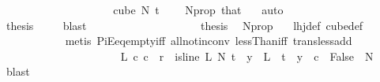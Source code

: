 \begin{isabellebody}
\ \ \ \ \ \ \ \ \isamarkupfalse%
{\isacharminus}{\kern0pt}\isanewline
\ \ \ \ \ \ \ \ \ \ \isamarkupfalse%
\ {\isachardoublequoteopen}cube\ N{\isacharprime}{\kern0pt}\ t\ {\isasymnoteq}\ {\isacharbraceleft}{\kern0pt}{\isacharbraceright}{\kern0pt}{\isachardoublequoteclose}\ \isamarkupfalse%
\ N{\isacharunderscore}{\kern0pt}prop{\isacharparenleft}{\kern0pt}{}{\isacharparenright}{\kern0pt}\ that\ {}\ \isamarkupfalse%
\ auto\ \ \ \isanewline
\ \ \ \ \ \ \ \ \ \ \isamarkupfalse%
\ \isamarkupfalse%
\ {\isacharquery}{\kern0pt}thesis\ \isamarkupfalse%
\ {}\ \isamarkupfalse%
\ blast\isanewline
\ \ \ \ \ \ \ \ \isamarkupfalse%
\isanewline
\ \ \ \ \ \ \ \ \isamarkupfalse%
\ \isamarkupfalse%
\ {\isacharquery}{\kern0pt}thesis\ \isamarkupfalse%
\ N{\isacharunderscore}{\kern0pt}prop\ \ \isamarkupfalse%
\ lhj{\isacharunderscore}{\kern0pt}def\ cube{\isacharunderscore}{\kern0pt}def\ \isanewline
\ \ \ \ \ \ \ \ \ \ \isamarkupfalse%
\ {\isacharparenleft}{\kern0pt}metis\ PiE{\isacharunderscore}{\kern0pt}eq{\isacharunderscore}{\kern0pt}empty{\isacharunderscore}{\kern0pt}iff\ all{\isacharunderscore}{\kern0pt}not{\isacharunderscore}{\kern0pt}in{\isacharunderscore}{\kern0pt}conv\ lessThan{\isacharunderscore}{\kern0pt}iff\ trans{\isacharunderscore}{\kern0pt}less{\isacharunderscore}{\kern0pt}add{}{\isacharparenright}{\kern0pt}\ \isanewline
\ \ \ \ \ \ \isamarkupfalse%
\isanewline
\ \ \ \ \ \ \ \ \isamarkupfalse%
\ {}\isanewline
\ \ \ \ \ \ \ \ \isamarkupfalse%
\ \isamarkupfalse%
\ {\isachardoublequoteopen}{\isacharparenleft}{\kern0pt}{\isasymexists}L\ c{\isachardot}{\kern0pt}\ c\ {\isacharless}{\kern0pt}\ r\ {\isasymand}\ is{\isacharunderscore}{\kern0pt}line\ L\ N{\isacharprime}{\kern0pt}\ t\ {\isasymand}\ {\isacharparenleft}{\kern0pt}{\isasymforall}y\ {\isasymin}\ L\ {\isacharbackquote}{\kern0pt}\ {\isacharbraceleft}{\kern0pt}{\isachardot}{\kern0pt}{\isachardot}{\kern0pt}{\isacharless}{\kern0pt}t{\isacharbraceright}{\kern0pt}{\isachardot}{\kern0pt}\ {\isasymchi}\ y\ {\isacharequal}{\kern0pt}\ c{\isacharparenright}{\kern0pt}{\isacharparenright}{\kern0pt}\ {\isasymLongrightarrow}\ False{\isachardoublequoteclose}\ \ N{\isacharprime}{\kern0pt}\ {\isasymchi}\ \isamarkupfalse%
\ blast\isanewline

\end{isabellebody}
